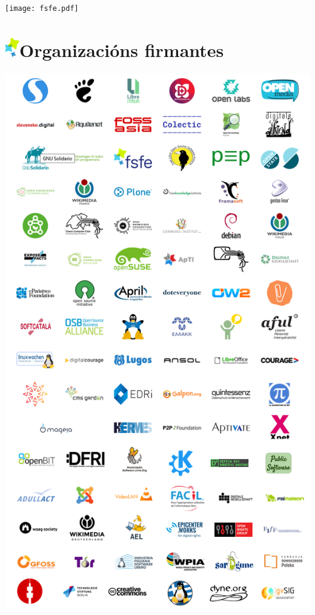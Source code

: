 \documentclass[10pt,foldmark,tumble]{leaflet}
\begin{document}
\vspace{1em}

\centering \texttt{[image: fsfe.pdf]}

\newpage
\section{\includegraphics{item.png}Organizacións firmantes}
\vspace{1em}
\includegraphics[scale=0.40]{colab.png}


\end{document}
